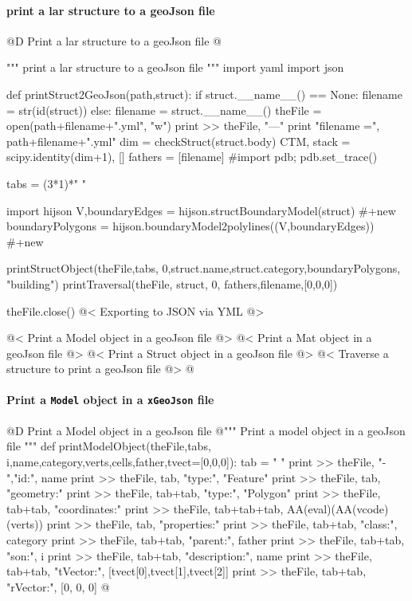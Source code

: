 \documentclass[11pt,oneside]{article}	%
\begin{document}
\paragraph{print a lar structure to a geoJson file}

@D Print a lar structure to a geoJson file
@{""" print a lar structure to a geoJson file """
import yaml
import json

	

def printStruct2GeoJson(path,struct):
	if struct.__name__() == None:
		filename = str(id(struct))
	else: 
		filename = struct.__name__()
	theFile = open(path+filename+".yml", "w")
	print >> theFile, "---"
	print "filename =", path+filename+".yml"
	dim = checkStruct(struct.body)
	CTM, stack = scipy.identity(dim+1), []
	fathers = [filename]
	#import pdb; pdb.set_trace()

	tabs = (3*1)*" "

	import hijson
	V,boundaryEdges = hijson.structBoundaryModel(struct)   #+new
	boundaryPolygons = hijson.boundaryModel2polylines((V,boundaryEdges))  #+new
	
	printStructObject(theFile,tabs, 0,struct.name,struct.category,boundaryPolygons, "building")
	printTraversal(theFile, struct, 0, fathers,filename,[0,0,0]) 

	theFile.close()
	@< Exporting to JSON via YML @>

@< Print a Model object in a geoJson file @>
@< Print a Mat object in a geoJson file @>
@< Print a Struct object in a geoJson file @>
@< Traverse a structure to print a geoJson file @>
@}

\paragraph{Print a \texttt{Model} object in a \texttt{xGeoJson} file}
	
@D Print a Model object in a geoJson file
@{""" Print a model object in a geoJson file """
def printModelObject(theFile,tabs, i,name,category,verts,cells,father,tvect=[0,0,0]):
	tab = "	"
	print >> theFile, "-   ","id:", name
	print >> theFile, tab, "type:", "Feature"
	print >> theFile, tab, "geometry:" 
	print >> theFile, tab+tab, "type:", "Polygon"
	print >> theFile, tab+tab, "coordinates:" 
	print >> theFile, tab+tab+tab, AA(eval)(AA(vcode)(verts))
	print >> theFile, tab, "properties:"
	print >> theFile, tab+tab, "class:", category
	print >> theFile, tab+tab, "parent:", father
	print >> theFile, tab+tab, "son:", i
	print >> theFile, tab+tab, "description:", name
	print >> theFile, tab+tab, "tVector:", [tvect[0],tvect[1],tvect[2]]
	print >> theFile, tab+tab, "rVector:", [0, 0, 0]
@}
\end{document}
